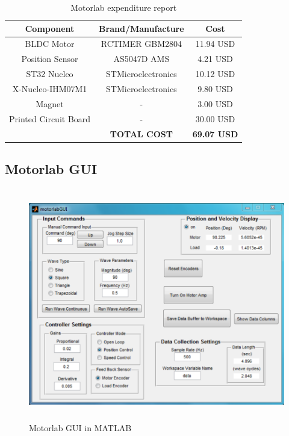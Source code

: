 \begin{table}[ht]
\begin{center}
\caption{Motorlab expenditure report}
\begin{tabular}[c]{|c|c|c|}

\hline
\textbf{Component} & \textbf{Brand/Manufacture} & \textbf{Cost} \\

\hline
BLDC Motor & RCTIMER GBM2804 & 11.94 USD\\

\hline
Position Sensor & AS5047D AMS & 4.21 USD\\

\hline
ST32 Nucleo & STMicroelectronics & 10.12 USD\\

\hline
X-Nucleo-IHM07M1 & STMicroelectronics & 9.80 USD\\

\hline
Magnet & - & 3.00 USD\\

\hline
Printed Circuit Board & - & 30.00 USD\\

\hline
& \textbf{TOTAL COST} & \textbf{69.07 USD}\\
\hline
\end{tabular}

\label{table1}
\end{center}
\end{table}

\newpage
\subsection{Motorlab GUI}
\label{makereference2.1.4} 
\begin{figure}[htb]
\begin{center}
    \includegraphics[height=4in]{figures/old_motorlab_gui.png}

    \caption[Motorlab GUI in MATLAB]{Motorlab GUI in MATLAB}

    \label{motorlab_gui_in_matlab}
\end{center}
\end{figure}

